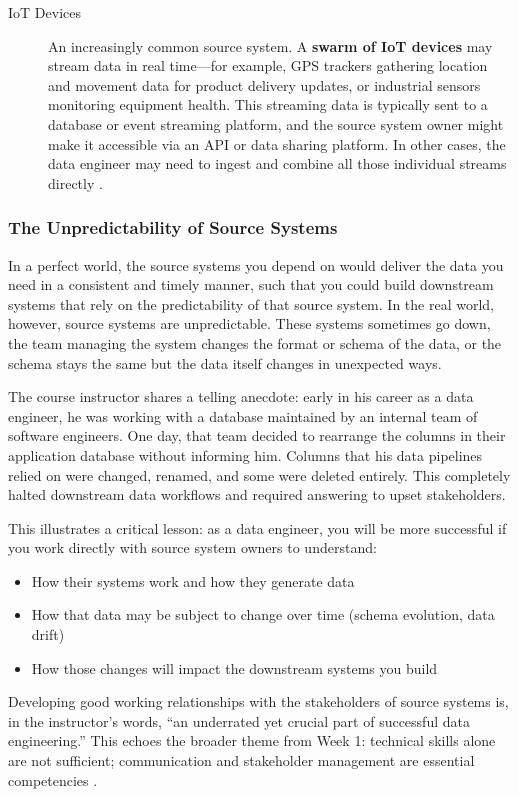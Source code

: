 \documentclass{article}
\begin{document}
\begin{description}
    \item[IoT Devices] An increasingly common source system. A \textbf{swarm of IoT devices} may stream data in real time---for example, GPS trackers gathering location and movement data for product delivery updates, or industrial sensors monitoring equipment health. This streaming data is typically sent to a database or event streaming platform, and the source system owner might make it accessible via an API or data sharing platform. In other cases, the data engineer may need to ingest and combine all those individual streams directly \cite{reis2022fundamentals}.
\end{description}

\subsubsection{The Unpredictability of Source Systems}
In a perfect world, the source systems you depend on would deliver the data you need in a consistent and timely manner, such that you could build downstream systems that rely on the predictability of that source system. In the real world, however, source systems are unpredictable. These systems sometimes go down, the team managing the system changes the format or schema of the data, or the schema stays the same but the data itself changes in unexpected ways.

The course instructor shares a telling anecdote: early in his career as a data engineer, he was working with a database maintained by an internal team of software engineers. One day, that team decided to rearrange the columns in their application database without informing him. Columns that his data pipelines relied on were changed, renamed, and some were deleted entirely. This completely halted downstream data workflows and required answering to upset stakeholders.

This illustrates a critical lesson: as a data engineer, you will be more successful if you work directly with source system owners to understand:
\begin{itemize}
    \item How their systems work and how they generate data
    \item How that data may be subject to change over time (schema evolution, data drift)
    \item How those changes will impact the downstream systems you build
\end{itemize}
Developing good working relationships with the stakeholders of source systems is, in the instructor's words, ``an underrated yet crucial part of successful data engineering.'' This echoes the broader theme from Week 1: technical skills alone are not sufficient; communication and stakeholder management are essential competencies \cite{reis2022fundamentals}.
\end{document}
